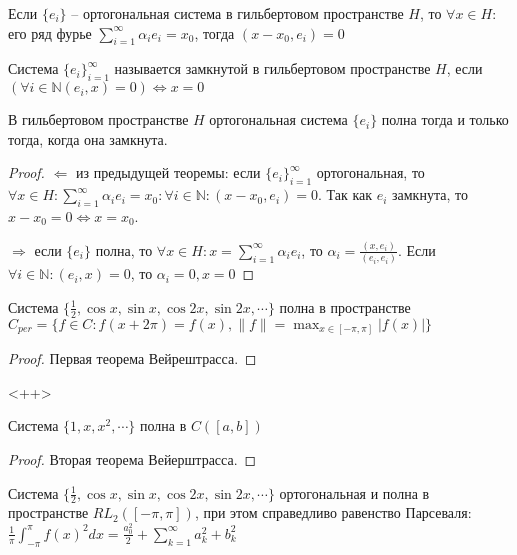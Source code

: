 \documentclass[document.tex]{subfiles}
\begin{document}
\begin{theorem}
    Если $\{e_i\}$ -- ортогональная система в гильбертовом пространстве $H$, то $\forall x \in H:$ его ряд фурье
    $\sum_{i = 1}^{\infty} \alpha_i e_i = x_0$, тогда $(x - x_0, e_i) = 0$
\end{theorem}

\begin{definition}
    Система $\{e_i\}_{i = 1}^{\infty}$ называется замкнутой в гильбертовом пространстве $H$, если $(\forall i \in
    \mathbb{N} (e_i, x) = 0) \Leftrightarrow x = 0$
\end{definition}

\begin{theorem}
    В гильбертовом пространстве $H$ ортогональная система $\{e_i\}$ полна тогда и только тогда, когда она замкнута.
\end{theorem}

\begin{proof}
    $\Leftarrow$ из предыдущей теоремы: если $\{e_i\}_{i = 1}^{\infty}$ ортогональная, то $\forall x \in H:
    \sum_{i = 1}^{\infty}\alpha_i e_i = x_0: \forall i \in \mathbb{N}: (x - x_0, e_i) = 0$. Так как $e_i$ замкнута, то
    $x - x_0 = 0 \Leftrightarrow x = x_0$.

    $\Rightarrow$ если $\{e_i\}$ полна, то $\forall x \in H: x = \sum_{i = 1}^{\infty} \alpha_i e_i$, то $\alpha_i =
    \frac{(x, e_i)}{(e_i, e_i)}$. Если $\forall i \in \mathbb{N}: (e_i, x) = 0$, то $\alpha_i = 0, x = 0$
\end{proof}

\begin{theorem}
    Система $\{\frac{1}{2}, \cos x, \sin x, \cos 2x, \sin 2x, \cdots \}$ полна в пространстве $C_{per} = \{f
        \in C: f(x + 2\pi) = f(x), \|f\| = \max_{x \in [-\pi, \pi]} |f(x)|\}$
\end{theorem}

\begin{proof}
    Первая теорема Вейрештрасса.
\end{proof}<++>

\begin{theorem}
    Система $\{1, x, x^2, \cdots\}$ полна в $C([a, b])$
\end{theorem}

\begin{proof}
    Вторая теорема Вейерштрасса.
\end{proof}

\begin{theorem}
    Система $\{\frac{1}{2}, \cos x, \sin x, \cos 2x, \sin 2x, \cdots \}$ ортогональная и полна в пространстве
    $RL_2([-\pi, \pi])$, при этом справедливо равенство Парсеваля: $\frac{1}{\pi}\int_{-\pi}^{\pi}f(x)^2 dx =
    \frac{a_0^2}{2} +
    \sum_{k = 1}^{\infty} a_k^2 + b_k^2$
\end{theorem}
\end{document}
